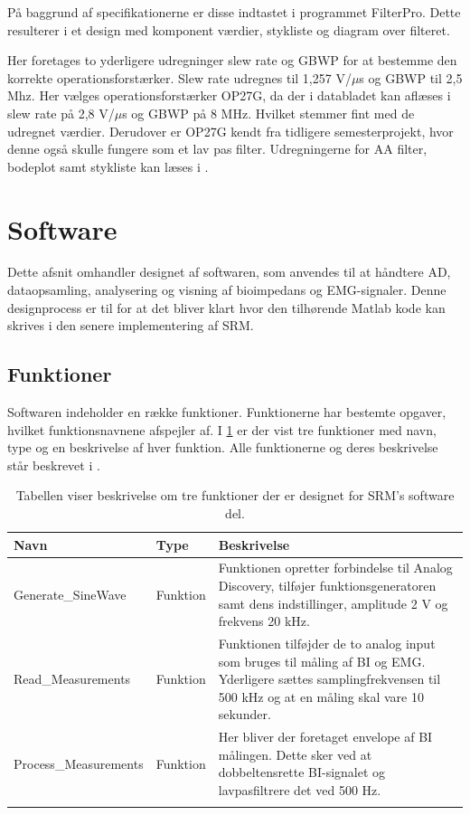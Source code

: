 På baggrund af specifikationerne er disse indtastet i programmet FilterPro. Dette resulterer i et design med komponent værdier, stykliste og diagram over filteret. 

Her foretages to yderligere udregninger slew rate og GBWP for at bestemme den korrekte operationsforstærker. Slew rate udregnes til 1,257 V/$\mu$s og GBWP til 2,5 Mhz. Her vælges operationsforstærker OP27G, da der i databladet kan aflæses i slew rate på 2,8 V/$\mu$s og GBWP på 8 MHz. Hvilket stemmer fint med de udregnet værdier. Derudover er OP27G kendt fra tidligere semesterprojekt, hvor denne også skulle fungere som et lav pas filter. Udregningerne for AA filter, bodeplot samt stykliste kan læses i .


\section{Software}

Dette afsnit omhandler designet af softwaren, som anvendes til at håndtere AD, dataopsamling, analysering og visning af bioimpedans og EMG-signaler. Denne designprocess
er til for at det bliver klart hvor den tilhørende Matlab kode kan skrives i den senere
implementering af SRM.


\subsection{Funktioner}
Softwaren indeholder en række funktioner. Funktionerne har bestemte opgaver, hvilket funktionsnavnene afspejler af. I \ref{tab:funktioner} er der vist tre funktioner med navn, type og en beskrivelse af hver funktion. Alle funktionerne og deres beskrivelse står beskrevet i . 

\begin{table}[H]

\begin{tabularx}{\textwidth}{l l X}
     Navn	&	Type		&	Beskrivelse \\ \midrule
     Generate\_SineWave	&	Funktion	&	Funktionen opretter forbindelse til Analog Discovery, tilføjer funktionsgeneratoren samt dens indstillinger, amplitude 2 V og frekvens 20 kHz.\\   \addlinespace[2mm]
     Read\_Measurements	&	Funktion	&	Funktionen tilføjder de to analog input som bruges til måling af BI og EMG. Yderligere sættes samplingfrekvensen til 500 kHz og at en måling skal vare 10 sekunder.\\   \addlinespace[2mm]
     Process\_Measurements	&	Funktion	&	Her bliver der foretaget envelope af BI målingen. Dette sker ved at dobbeltensrette BI-signalet og lavpasfiltrere det ved 500 Hz.   \\   \addlinespace[2mm]
     \bottomrule                                                                                                                   
    \end{tabularx}
    \caption {Tabellen viser beskrivelse om tre funktioner der er designet for SRM's software del.}
    \label{tab:funktioner}
	
\end{table}

